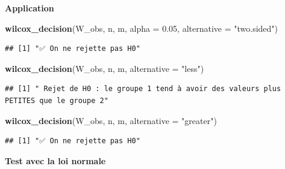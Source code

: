 \documentclass[
  12pt,
]{article}
\newenvironment{Shaded}{\begin{snugshade}}{\end{snugshade}}
\newcommand{\AttributeTok}[1]{\textcolor[rgb]{0.13,0.29,0.53}{#1}}
\newcommand{\FloatTok}[1]{\textcolor[rgb]{0.00,0.00,0.81}{#1}}
\newcommand{\FunctionTok}[1]{\textcolor[rgb]{0.13,0.29,0.53}{\textbf{#1}}}
\newcommand{\NormalTok}[1]{#1}
\newcommand{\StringTok}[1]{\textcolor[rgb]{0.31,0.60,0.02}{#1}}
\begin{document}
\textbf{Application}

\begin{Shaded}
\begin{Highlighting}[]
\FunctionTok{wilcox\_decision}\NormalTok{(W\_obs,  n, m, }\AttributeTok{alpha =} \FloatTok{0.05}\NormalTok{, }\AttributeTok{alternative =} \StringTok{"two.sided"}\NormalTok{)}
\end{Highlighting}
\end{Shaded}

\begin{verbatim}
## [1] "✅ On ne rejette pas H0"
\end{verbatim}

\begin{Shaded}
\begin{Highlighting}[]
\FunctionTok{wilcox\_decision}\NormalTok{(W\_obs,  n, m, }\AttributeTok{alternative =} \StringTok{"less"}\NormalTok{)}
\end{Highlighting}
\end{Shaded}

\begin{verbatim}
## [1] " Rejet de H0 : le groupe 1 tend à avoir des valeurs plus PETITES que le groupe 2"
\end{verbatim}

\begin{Shaded}
\begin{Highlighting}[]
\FunctionTok{wilcox\_decision}\NormalTok{(W\_obs,  n, m, }\AttributeTok{alternative =} \StringTok{"greater"}\NormalTok{)}
\end{Highlighting}
\end{Shaded}

\begin{verbatim}
## [1] "✅ On ne rejette pas H0"
\end{verbatim}

\textbf{Test avec la loi normale}
\end{document}
